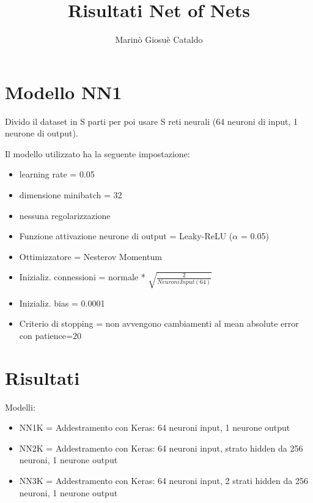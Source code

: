 \documentclass[]{article}
\title{Risultati Net of Nets}
\author{Marinò Giosuè Cataldo}
\begin{document}
	
	\section{Modello NN1}
	Divido il dataset in S parti per poi usare S reti neurali (64 neuroni di input, 1 neurone di output).
	
	Il modello utilizzato ha la seguente impostazione:
	\begin{itemize}
		\item learning rate = 0.05
		\item dimensione minibatch = 32
		\item nessuna regolarizzazione
		\item Funzione attivazione neurone di output = Leaky-ReLU ($\alpha$ = 0.05)
		\item Ottimizzatore = Nesterov Momentum
		\item Inizializ. connessioni = normale * $\sqrt{\frac{2}{NeuroniInput(64)}}$		
		\item Inizializ. bias = 0.0001
		\item Criterio di stopping = non avvengono cambiamenti al mean absolute error con patience=20
		
		
		
	\end{itemize}
	
	


\section{Risultati}
	Modelli:
	\begin{itemize}
		\item NN1K = Addestramento con Keras: 64 neuroni input, 1 neurone output
		\item NN2K = Addestramento con Keras: 64 neuroni input, strato hidden da 256 neuroni, 1 neurone output
		\item NN3K = Addestramento con Keras: 64 neuroni input, 2 strati hidden da 256 neuroni, 1 neurone output
	\end{itemize}
	
\end{document}
